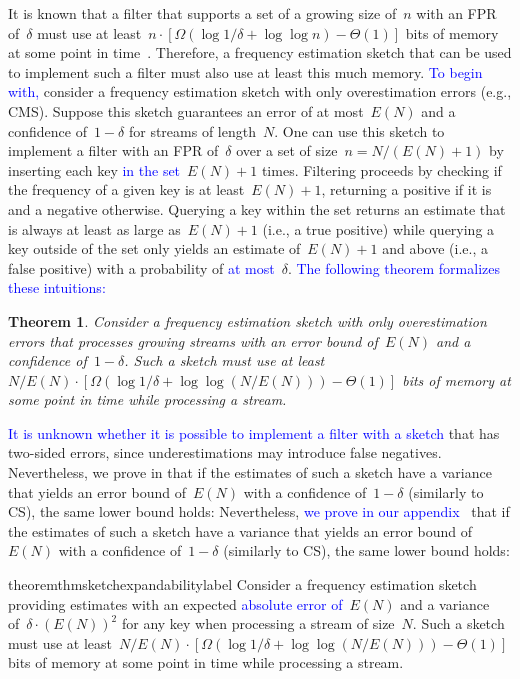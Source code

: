 \documentclass[sigconf]{acmart}
\newtheorem{theorem}{Theorem}[section]
\begin{document}
It is known that a filter that supports a set of a growing size of~$n$ with an
FPR of~$\delta$ must use at least~$n \cdot [ \Omega( \log 1/\delta + \log\log
n) - \Theta(1)]$ bits of memory at some point in time~\cite{PaghExpandability}.
Therefore, a frequency estimation sketch that can be used to implement such a
filter must also use at least this much memory. \textcolor{blue}{To begin
with,} consider a frequency estimation sketch with only overestimation errors
(e.g., CMS). Suppose this sketch guarantees an error of at most~$E(N)$ and a
confidence of~$1-\delta$ for streams of length~$N$. One can use this sketch to
implement a filter with an FPR of~$\delta$ over a set of size~$n=N/(E(N)+1)$ by
inserting each key \textcolor{blue}{in the set}~$E(N)+1$ times. Filtering
proceeds by checking if the frequency of a given key is at least~$E(N)+1$,
returning a positive if it is and a negative otherwise. Querying a key within
the set returns an estimate that is always at least as large as~$E(N)+1$ (i.e.,
a true positive) while querying a key outside of the set only yields an
estimate of~$E(N)+1$ and above (i.e., a false positive) with a probability of
\textcolor{blue}{at most}~$\delta$. \textcolor{blue}{The following theorem
formalizes these intuitions:}
\begin{theorem}
    \label{thm:sketch_expandability_special_case}
    Consider a frequency estimation sketch with only overestimation errors that
    processes growing streams with an error bound of~$E(N)$ and a confidence
    of~$1-\delta$. Such a sketch must use at least~$N/E(N) \cdot [\Omega\left(
    \log 1/\delta + \log\log (N/E(N)) \right) - \Theta(1)]$ bits of memory at
    some point in time while processing a stream.
\end{theorem}

\textcolor{blue}{It is unknown whether it is possible to implement a filter
with a sketch} that has two-sided errors, since underestimations may introduce
false negatives. 
\ifappendix
Nevertheless, we prove in 
that
if the estimates of such a sketch have a variance that yields an error bound
of~$E(N)$ with a confidence of~$1-\delta$ (similarly to CS), the same lower
bound holds:
\else 
Nevertheless, \textcolor{blue}{we prove in our appendix~\cite{SublimeArxiv}}
that if the estimates of such a sketch have a variance that yields an error
bound of~$E(N)$ with a confidence of~$1-\delta$ (similarly to CS), the same
lower bound holds:
\fi
\begin{restatable}{theorem}{thmsketchexpandabilitylabel}
    \label{thm:sketch_expandability}
    Consider a frequency estimation sketch providing estimates with an expected
    \textcolor{blue}{absolute error of}~$E(N)$ and a variance of~$\delta \cdot
    (E(N))^2$ for any key when processing a stream of size~$N$. Such a sketch
    must use at least~$N/E(N) \cdot [\Omega(\log 1/\delta + \log\log (N/E(N)))
    - \Theta(1)]$ bits of memory at some point in time while processing a
    stream.
\end{restatable}
\end{document}
